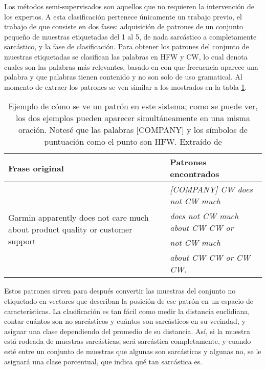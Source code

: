 \par Los métodos semi-supervisados son aquellos que no requieren la intervención de los expertos. A esta clasificación pertenece únicamente un trabajo previo, el trabajo de \textcite{davidov2010semi} que consiste en dos fases: adquisición de patrones de un conjunto pequeño de muestras etiquetadas del 1 al 5, de nada sarcástico a completamente sarcástico,  y la fase de clasificación. Para obtener los patrones del conjunto de muestras etiquetadas se clasifican las palabras en \gls{HFW} y \gls{CW}, lo cual denota cuales son las palabras más relevantes, basado en con que frecuencia aparece una palabra y que palabras tienen contenido y no son solo de uso gramatical. Al momento de extraer los patrones se ven similar a los mostrados en la tabla \ref{tab:ejemplo}.
\begin{center}
	\begin{table}[h]
		\caption{\footnotesize{Ejemplo de cómo se ve un patrón en este sistema; como se puede ver, los dos ejemplos pueden aparecer simultáneamente en una misma oración. Notesé que las palabras [COMPANY] y los símbolos de puntuación como el punto son \gls{HFW}. Extraído de \textcite{davidov2010semi}}}
		\label{tab:ejemplo}
		\begin{tabular}{|p{6.5cm}|p{7cm}|}
			\hline
			Frase original & Patrones encontrados                              \\
			\hline
			\multirow{4}{6cm}{Garmin apparently does not care much about product quality or customer support}
			               & \tabitem \textit{[COMPANY] CW does not CW much}   \\
			               & \tabitem \textit{does not CW much about CW CW or} \\
			               & \tabitem \textit{not CW much}                     \\
			               & \tabitem \textit{about CW CW or CW CW.}           \\
			\hline
		\end{tabular}
	\end{table}
\end{center}
\par Estos patrones sirven para después convertir las muestras del conjunto no etiquetado en vectores que describan la posición de ese patrón en un espacio de características. La clasificación es tan fácil como medir la distancia euclidiana, contar cuántos son no sarcásticos y cuántos son sarcásticos en su vecindad, y asignar una clase dependiendo del promedio de su distancia. Así, si la muestra está rodeada de muestras sarcásticas, será sarcástica completamente, y cuando esté entre un conjunto de muestras que algunas son sarcásticas y algunas no, se le asignará una clase porcentual, que indica qué tan sarcástica es.

